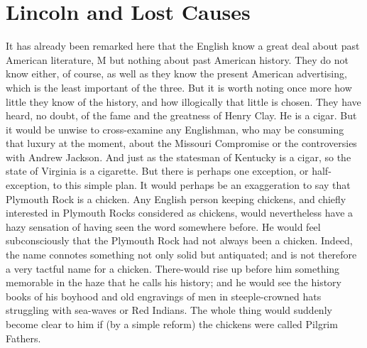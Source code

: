 \documentclass{book}
\begin{document}
\chapter{Lincoln and Lost Causes}
\label{chapter-13}
It has already been remarked here that the English know a great deal about past American literature, M but nothing about past American history. They do not know either, of course, as well as they know the present American advertising, which is the least important of the three. But it is worth noting once more how little they know of the history, and how illogically that little is chosen. They have heard, no doubt, of the fame and the greatness of Henry Clay. He is a cigar. But it would be unwise to cross-examine any Englishman, who may be consuming that luxury at the moment, about the Missouri Compromise or the controversies with Andrew Jackson. And just as the statesman of Kentucky is a cigar, so the state of Virginia is a cigarette. But there is perhaps one exception, or half-exception, to this simple plan. It would perhaps be an exaggeration to say that Plymouth Rock is a chicken. Any English person keeping chickens, and chiefly interested in Plymouth Rocks considered as chickens, would nevertheless have a hazy sensation of having seen the word somewhere before. He would feel subconsciously that the Plymouth Rock had not always been a chicken. Indeed, the name connotes something not only solid but antiquated; and is not therefore a very tactful name for a chicken. There-would rise up before him something memorable in the haze that he calls his history; and he would see the history books of his boyhood and old engravings of men in steeple-crowned hats struggling with sea-waves or Red Indians. The whole thing would suddenly become clear to him if (by a simple reform) the chickens were called Pilgrim Fathers.
\end{document}
